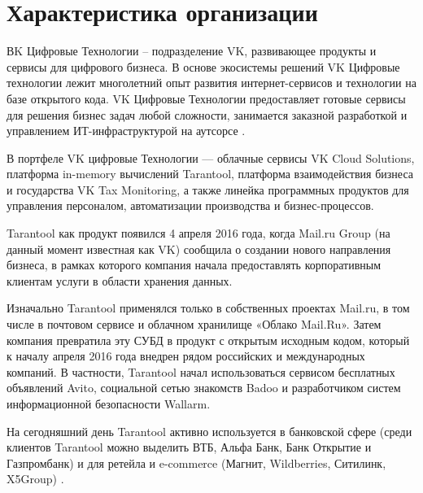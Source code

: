 
\section{Характеристика организации}

ВK Цифровые Технологии – подразделение VK, развивающее продукты и сервисы для цифрового бизнеса. В основе экосистемы решений VK Цифровые технологии лежит многолетний опыт развития интернет-сервисов и технологии на базе открытого кода. VK Цифровые Технологии предоставляет готовые сервисы для решения бизнес задач любой сложности, занимается заказной разработкой и управлением ИТ-инфраструктурой на аутсорсе \cite{VkTech}.

В портфеле VK цифровые Технологии — облачные сервисы VK Cloud Solutions, платформа in-memory вычислений Tarantool, платформа взаимодействия бизнеса и государства VK Tax Monitoring, а также линейка программных продуктов для управления персоналом, автоматизации производства и бизнес-процессов.

Tarantool как продукт появился 4 апреля 2016 года, когда Mail.ru Group (на данный момент известная как VK) сообщила о создании нового направления бизнеса, в рамках которого компания начала предоставлять корпоративным клиентам услуги в области хранения данных.

Изначально Tarantool применялся только в собственных проектах Mail.ru, в том числе в почтовом сервисе и облачном хранилище «Облако Mail.Ru». Затем компания превратила эту СУБД в продукт с открытым исходным кодом, который к началу апреля 2016 года внедрен рядом российских и международных компаний. В частности, Tarantool начал использоваться сервисом бесплатных объявлений Avito, социальной сетью знакомств Badoo и разработчиком систем информационной безопасности Wallarm.

На сегодняшний день Tarantool активно используется в банковской сфере (среди клиентов Tarantool можно выделить ВТБ, Альфа Банк, Банк Открытие и Газпромбанк) и для ретейла и e-commerce (Магнит, Wildberries, Ситилинк, X5Group) \cite{Tarantool}.
